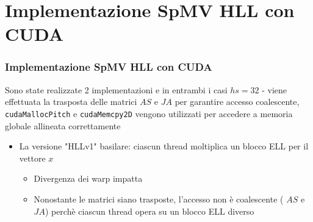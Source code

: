 \documentclass{beamer}
\begin{document}
\section{Implementazione SpMV HLL con CUDA}
\begin{frame}
    \frametitle{Implementazione SpMV HLL con CUDA}
    
    Sono state realizzate 2 implementazioni e in entrambi i casi $hs = 32$ - viene effettuata la
    trasposta delle matrici $AS$ e $JA$ per garantire accesso coalescente, 
    \texttt{cudaMallocPitch} e \texttt{cudaMemcpy2D} vengono utilizzati per accedere a memoria 
    globale allineata correttamente
    
    \begin{itemize}
    	\item La versione "HLLv1" basilare: ciascun thread moltiplica un blocco ELL per il vettore
    	$x$
    	
    	\begin{itemize}
    		\item Divergenza dei warp impatta
    		\item Nonostante le matrici siano trasposte, l'accesso non è coalescente (
    		$AS$ e $JA$) perchè
    		ciascun thread opera su un blocco ELL diverso
    	\end{itemize}

    \end{itemize}
    
\end{frame}
\end{document}

